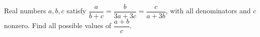 Real numbers $a,b,c$ satisfy $\dfrac{a}{b+c}=\dfrac{b}{3a+3c}=\dfrac{c}{a+3b}$, with all denominators and $c$ nonzero. Find all possible values of $\dfrac{a+b}{c}$.
